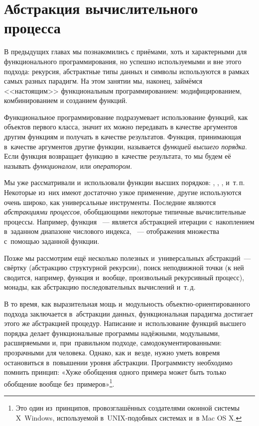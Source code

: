 %
\label{Less:high-order}

\section[4]{Абстракция вычислительного процесса}%
В предыдущих главах мы познакомились с приёмами, хоть и характерными для функционального программирования, но успешно используемыми и вне этого подхода: рекурсия, абстрактные типы данных и символы используются в рамках самых разных парадигм. На этом занятии мы, наконец, займёмся <<настоящим>> функциональным программированием: модифицированием, комбинированием и созданием функций. 

Функциональное программирование подразумевает использование функций, как объектов первого класса, значит их можно передавать в качестве аргументов другим функциям и получать в качестве результатов.
Функция, принимающая в~качестве аргументов другие функции, называется \emph{функцией высшего порядка}. Если функция возвращает функцию в~качестве результата, то мы будем её называть \emph{функционалом}, или \emph{оператором.} 

Мы уже рассматривали и~использовали функции высших порядков: , , ,  и~т.\,п. Некоторые из~них имеют достаточно узкое применение, другие используются очень широко, как универсальные инструменты. Последние являются \emph{абстракциями процессов}, обобщающими некоторые типичные вычислительные процессы. Например, функция ~--- является абстракцией итерации с~накоплением в~заданном диапазоне числового индекса, ~--- отображения множества с~помощью заданной функции.

Позже мы рассмотрим ещё несколько полезных и~универсальных абстракций~--- свёртку (абстракцию структурной рекурсии), поиск неподвижной точки (к ней сводится, например, функция  и~вообще, произвольный рекурсивный процесс), монады, как абстракцию последовательных вычислений и~т.\,д.

В то время, как выразительная мощь и~модульность объектно-ориентированного подхода заключается в~абстракции данных, функциональная парадигма достигает этого же абстракцией процедур. Написание и~использование функций высшего порядка делает функциональные программы надёжными, модульными, расширяемыми и, при~правильном подходе, самодокументированными: прозрачными для человека. 
Однако, как и~везде, нужно уметь вовремя остановиться в~повышении уровня абстракции. Программисту необходимо помнить принцип: «Хуже обобщения одного примера может быть только обобщение вообще без~примеров»\footnote{Это один из~принципов, провозглашённых создателями оконной системы X~Windows, используемой в~UNIX-подобных системах и~в Mac OS X.}.


